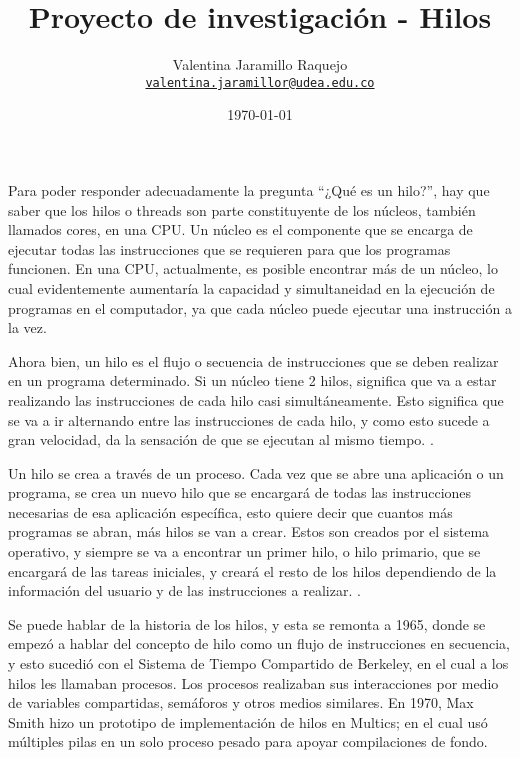 \documentclass[12pt]{article}
\title{Proyecto de investigación - Hilos
}
\author{Valentina Jaramillo Raquejo\\%
    \href{mailto:valentina.jaramillor@udea.edu.co}{\texttt{valentina.jaramillor@udea.edu.co}} %
    }
\date{\today}
\begin{document}
{
\maketitle


Para poder responder adecuadamente la pregunta “¿Qué es un hilo?”, hay que saber que los hilos o threads son parte constituyente de los núcleos, también llamados cores, en una CPU. Un núcleo es el componente que se encarga de ejecutar todas las instrucciones que se requieren para que los programas funcionen. En una CPU, actualmente, es posible encontrar más de un núcleo, lo cual evidentemente aumentaría la capacidad y simultaneidad en la ejecución de programas en el computador, ya que cada núcleo puede ejecutar una instrucción a la vez. 
\newline

Ahora bien, un hilo es el flujo o secuencia de instrucciones que se deben realizar en un programa determinado. Si un núcleo tiene 2 hilos, significa que va a estar realizando las instrucciones de cada hilo casi simultáneamente. Esto significa que se va a ir alternando entre las instrucciones de cada hilo, y como esto sucede a gran velocidad, da la sensación de que se ejecutan al mismo tiempo. \citep{Defini}.
\newline

Un hilo se crea a través de un proceso. Cada vez que se abre una aplicación o un programa, se crea un nuevo hilo que se encargará de todas las instrucciones necesarias de esa aplicación específica, esto quiere decir que cuantos más programas se abran, más hilos se van a crear. Estos son creados por el sistema operativo, y siempre se va a encontrar un primer hilo, o hilo primario, que se encargará de las tareas iniciales, y creará el resto de los hilos dependiendo de la información del usuario y de las instrucciones a realizar. \citep{Defini2}.
\newline

Se puede hablar de la historia de los hilos, y esta se remonta a 1965, donde se empezó a hablar del concepto de hilo como un flujo de instrucciones en secuencia, y esto sucedió con el Sistema de Tiempo Compartido de Berkeley, en el cual a los hilos les llamaban procesos.
Los procesos realizaban sus interacciones por medio de variables compartidas, semáforos y otros medios similares. En 1970, Max Smith hizo un prototipo de implementación de hilos en Multics; en el cual usó múltiples pilas en un solo proceso pesado para apoyar compilaciones de fondo.
\newline

}
\end{document}

